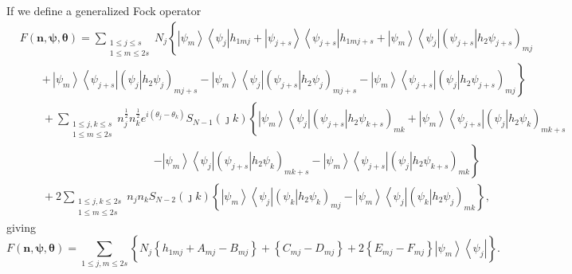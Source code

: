 \documentclass[aps,preprint]{revtex4}%
\begin{document}
If we define a generalized Fock operator
\begin{align}
&  F\left(  \mathbf{n},\mathbf{\psi},\mathbf{\theta}\right)  =\sum
_{\substack{1\leq j\leq s\\1\leq m\leq2s}}N_{j}\left\{  \left\vert \psi
_{m}\right\rangle \left\langle \psi_{j}\right\vert h_{1mj}+\left\vert
\psi_{j+s}\right\rangle \left\langle \psi_{j+s}\right\vert h_{1mj+s}%
+\left\vert \psi_{m}\right\rangle \left\langle \psi_{j}\right\vert \left(
\left.  \psi_{j+s}\right\vert h_{2}\psi_{j+s}\right)  _{mj}\right. \nonumber\\
&  \qquad\left.  +\,\left\vert \psi_{m}\right\rangle \left\langle \psi
_{j+s}\right\vert \left(  \left.  \psi_{j}\right\vert h_{2}\psi_{j}\right)
_{mj+s}-\left\vert \psi_{m}\right\rangle \left\langle \psi_{j}\right\vert
\left(  \left.  \psi_{j+s}\right\vert h_{2}\psi_{j}\right)  _{mj+s}-\left\vert
\psi_{m}\right\rangle \left\langle \psi_{j+s}\right\vert \left(  \left.
\psi_{j}\right\vert h_{2}\psi_{j+s}\right)  _{mj}\right\} \nonumber\\
&  \qquad+\sum_{\substack{1\leq j,k\leq s\\1\leq m\leq2s}}n_{j}^{\frac{1}{2}%
}n_{k}^{\frac{1}{2}}e^{i\left(  \theta_{j}-\theta_{k}\right)  }S_{N-1}\left(
\jmath k\right)  \left\{  \left\vert \psi_{m}\right\rangle \left\langle
\psi_{j}\right\vert \left(  \left.  \psi_{j+s}\right\vert h_{2}\psi
_{k+s}\right)  _{mk}+\left\vert \psi_{m}\right\rangle \left\langle \psi
_{j+s}\right\vert \left(  \left.  \psi_{j}\right\vert h_{2}\psi_{k}\right)
_{mk+s}\right. \nonumber\\
&  \qquad\qquad\qquad\qquad\qquad\qquad\left.  -\left\vert \psi_{m}%
\right\rangle \left\langle \psi_{j}\right\vert \left(  \left.  \psi
_{j+s}\right\vert h_{2}\psi_{k}\right)  _{mk+s}-\left\vert \psi_{m}%
\right\rangle \left\langle \psi_{j+s}\right\vert \left(  \left.  \psi
_{j}\right\vert h_{2}\psi_{k+s}\right)  _{mk}\right\} \nonumber\\
&  \qquad+2\sum_{\substack{1\leq j,k\leq2s\\1\leq m\leq2s}}n_{j}n_{k}%
S_{N-2}\left(  \jmath k\right)  \left\{  \left\vert \psi_{m}\right\rangle
\left\langle \psi_{j}\right\vert \left(  \left.  \psi_{k}\right\vert h_{2}%
\psi_{k}\right)  _{mj}-\left\vert \psi_{m}\right\rangle \left\langle \psi
_{j}\right\vert \left(  \left.  \psi_{k}\right\vert h_{2}\psi_{j}\right)
_{mk}\right\}  ,
\end{align}
giving%
\begin{equation}
F\left(  \mathbf{n},\mathbf{\psi},\mathbf{\theta}\right)  =\sum_{1\leq
j,m\leq2s}\left\{  N_{j}\left\{  h_{1mj}+A_{mj}-B_{mj}\right\}  +\left\{
C_{mj}-D_{mj}\right\}  +2\overset{}{\left\{  E_{mj}-F_{mj}\right\}  \left\vert
\psi_{m}\right\rangle \left\langle \psi_{j}\right\vert }\right\}  .
\end{equation}
\end{document}
